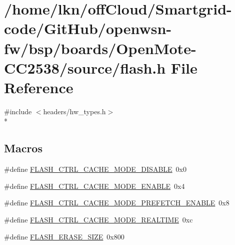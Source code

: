 \hypertarget{_open_mote-_c_c2538_2source_2flash_8h}{}\section{/home/lkn/off\+Cloud/\+Smartgrid-\/code/\+Git\+Hub/openwsn-\/fw/bsp/boards/\+Open\+Mote-\/\+C\+C2538/source/flash.h File Reference}
\label{_open_mote-_c_c2538_2source_2flash_8h}
{\ttfamily \#include $<$headers/hw\+\_\+types.\+h$>$}\\*
\subsection*{Macros}
\begin{DoxyCompactItemize}
\item 
\#define \hyperlink{_open_mote-_c_c2538_2source_2flash_8h_acc9751ec02385b9fc8235e3e8fa2330b}{F\+L\+A\+S\+H\+\_\+\+C\+T\+R\+L\+\_\+\+C\+A\+C\+H\+E\+\_\+\+M\+O\+D\+E\+\_\+\+D\+I\+S\+A\+B\+LE}~0x0
\item 
\#define \hyperlink{_open_mote-_c_c2538_2source_2flash_8h_acc5e1f0a1805212cc69284cf327b3db2}{F\+L\+A\+S\+H\+\_\+\+C\+T\+R\+L\+\_\+\+C\+A\+C\+H\+E\+\_\+\+M\+O\+D\+E\+\_\+\+E\+N\+A\+B\+LE}~0x4
\item 
\#define \hyperlink{_open_mote-_c_c2538_2source_2flash_8h_a56d6bbae8e4736a3fc7cb2fa55077c97}{F\+L\+A\+S\+H\+\_\+\+C\+T\+R\+L\+\_\+\+C\+A\+C\+H\+E\+\_\+\+M\+O\+D\+E\+\_\+\+P\+R\+E\+F\+E\+T\+C\+H\+\_\+\+E\+N\+A\+B\+LE}~0x8
\item 
\#define \hyperlink{_open_mote-_c_c2538_2source_2flash_8h_a14981ed9543173f55e74c80a30f10110}{F\+L\+A\+S\+H\+\_\+\+C\+T\+R\+L\+\_\+\+C\+A\+C\+H\+E\+\_\+\+M\+O\+D\+E\+\_\+\+R\+E\+A\+L\+T\+I\+ME}~0xc
\item 
\#define \hyperlink{_open_mote-_c_c2538_2source_2flash_8h_a7407d0bb0053b539b8144477b446978a}{F\+L\+A\+S\+H\+\_\+\+E\+R\+A\+S\+E\+\_\+\+S\+I\+ZE}~0x800
\end{DoxyCompactItemize}
